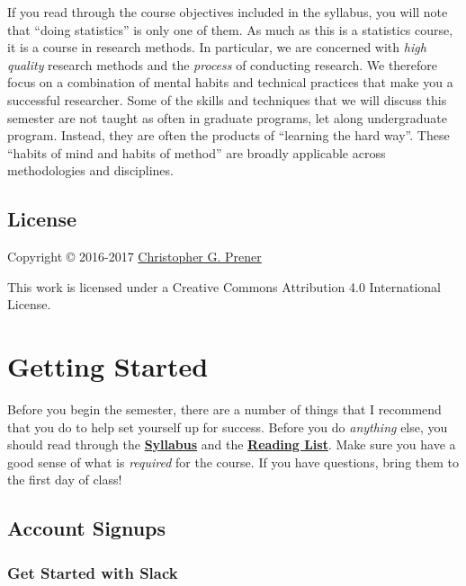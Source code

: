 \documentclass[]{book}
\theoremstyle{definition}
\theoremstyle{definition}
\theoremstyle{remark}
\begin{document}
If you read through the course objectives included in the syllabus, you
will note that ``doing statistics'' is only one of them. As much as this
is a statistics course, it is a course in research methods. In
particular, we are concerned with \emph{high quality} research methods
and the \emph{process} of conducting research. We therefore focus on a
combination of mental habits and technical practices that make you a
successful researcher. Some of the skills and techniques that we will
discuss this semester are not taught as often in graduate programs, let
along undergraduate program. Instead, they are often the products of
``learning the hard way''. These ``habits of mind and habits of method''
are broadly applicable across methodologies and disciplines.

\section*{License}\label{license}

Copyright © 2016-2017 \href{http://chris-prener.github.io}{Christopher
G. Prener}

This work is licensed under a Creative Commons Attribution 4.0
International License.

\chapter{Getting Started}\label{gettingStarted}

Before you begin the semester, there are a number of things that I
recommend that you do to help set yourself up for success. Before you do
\emph{anything} else, you should read through the
\href{https://cdn.rawgit.com/slu-soc5050/Core-Documents/bdcce556/syllabus.pdf}{\textbf{Syllabus}}
and the
\href{https://cdn.rawgit.com/slu-soc5050/Core-Documents/bdcce556/reading-list.pdf}{\textbf{Reading
List}}. Make sure you have a good sense of what is \emph{required} for
the course. If you have questions, bring them to the first day of class!

\section{Account Signups}\label{account-signups}

\subsection{Get Started with Slack}\label{get-started-with-slack}
\end{document}
